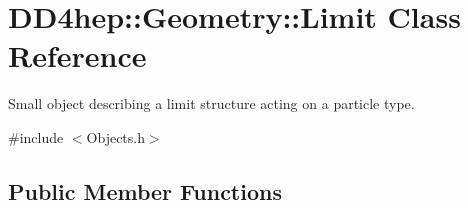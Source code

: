 \hypertarget{class_d_d4hep_1_1_geometry_1_1_limit}{}\section{D\+D4hep\+:\+:Geometry\+:\+:Limit Class Reference}
\label{class_d_d4hep_1_1_geometry_1_1_limit}


Small object describing a limit structure acting on a particle type.  




{\ttfamily \#include $<$Objects.\+h$>$}

\subsection*{Public Member Functions}
